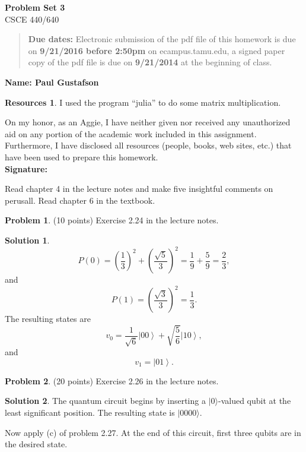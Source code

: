 \documentclass{article}
\theoremstyle{definition}
\newtheorem{problem}{Problem}
\newtheorem*{solution}{Solution}
\newtheorem*{resources}{Resources}
\newcommand{\ket}[1]{|#1\rangle}
\newcommand{\name}[1]{\noindent\textbf{Name: #1}}
\newcommand{\honor}{\noindent On my honor, as an Aggie, I have neither
  given nor received any unauthorized aid on any portion of the
  academic work included in this assignment. Furthermore, I have
  disclosed all resources (people, books, web sites, etc.) that have
  been used to prepare this homework. \\[1ex]
 \textbf{Signature:} \underline{\hspace*{5cm}} }
\newcommand{\problemset}[1]{\begin{center}\textbf{Problem Set #1}\\ 
CSCE 440/640\end{center}}
\newcommand{\duedate}[2]{\begin{quote}\textbf{Due dates:} Electronic
    submission of the pdf file of this homework is due on \textbf{#1} on ecampus.tamu.edu, a signed paper copy
    of the pdf file is due on \textbf{#2} at the beginning of
    class. \end{quote} }
\begin{document}
\problemset{3}
\duedate{9/21/2016 before 2:50pm}{9/21/2014}
\name{ Paul Gustafson}
\begin{resources} I used the program ``julia'' to do some matrix multiplication.
\end{resources}
\honor

\newpage

\noindent Read chapter 4 in the lecture notes and make five insightful
comments on perusall. Read chapter 6 in the textbook. \medskip


\begin{problem}(10 points) 
Exercise 2.24 in the lecture notes. 
\end{problem}
\begin{solution}
$$P(0) = \left(\frac{1}{3}\right)^2 + \left(\frac{\sqrt 5}{3}\right)^2 =  \frac{1}{9} + \frac{5}{9} = \frac{2}{3},$$
and
$$P(1) = \left(\frac{\sqrt 3}{3}\right)^2 = \frac{1}{3}.$$
The resulting states are
$$v_0 = \frac{1}{\sqrt 6} \left| 00 \right\rangle + \sqrt{\frac{5}{6}} \left| 10 \right\rangle,$$
and
$$v_1 = \left| 01 \right\rangle.$$
\end{solution}

\begin{problem}(20 points) 
Exercise 2.26 in the lecture notes. 
\end{problem}
\begin{solution}
The quantum circuit begins by inserting a $\ket{0}$-valued qubit at the least significant position.
The resulting state is $\ket{0000}$.

Now apply (c) of problem 2.27.  At the end of this circuit, first three qubits are in the desired state.

\end{solution}
\end{document}
